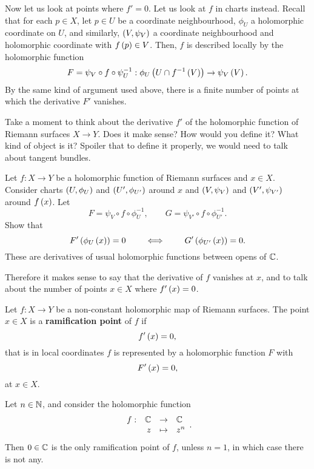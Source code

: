 Now let us look at points where $ f' = 0 $. Let us look at $ f $ in charts instead. Recall that for each $ p \in X $, let $ p \in U $ be a coordinate neighbourhood, $ \phi_U $ a holomorphic coordinate on $ U $, and similarly, $ \left( V, \psi_V \right) $ a coordinate neighbourhood and holomorphic coordinate with $ f\left( p \right) \in V $. Then, $ f $ is described locally by the holomorphic function
$$ F = \psi_V \circ f \circ \psi_U^{-1} : \phi_U\left( U \cap f^{-1}\left( V \right) \right) \to \psi_V\left( V \right). $$
By the same kind of argument used above, there is a finite number of points at which the derivative $ F' $ vanishes.

\begin{exercise}
Take a moment to think about the derivative $ f' $ of the holomorphic function of Riemann surfaces $ X \to Y $. Does it make sense? How would you define it? What kind of object is it? Spoiler that to define it properly, we would need to talk about tangent bundles.
\end{exercise}

\begin{exercise}
Let $ f : X \to Y $ be a holomorphic function of Riemann surfaces and $ x \in X $. Consider charts $ \left( U, \phi_U \right) $ and $ \left( U', \phi_{U'} \right) $ around $ x $ and $ \left( V, \psi_V \right) $ and $ \left( V', \psi_{V'} \right) $ around $ f\left( x \right) $. Let
$$ F = \psi_V \circ f \circ \phi_U^{-1}, \qquad G = \psi_{V'} \circ f \circ \phi_{U'}^{-1}. $$
Show that
$$ F'\left( \phi_U\left( x \right) \right) = 0 \qquad \iff \qquad G'\left( \phi_{U'}\left( x \right) \right) = 0. $$
These are derivatives of usual holomorphic functions between opens of $ \mathbb{C} $.
\end{exercise}

Therefore it makes sense to say that the derivative of $ f $ vanishes at $ x $, and to talk about the number of points $ x \in X $ where $ f'\left( x \right) = 0 $.

\pagebreak

\begin{definition}
Let $ f : X \to Y $ be a non-constant holomorphic map of Riemann surfaces. The point $ x \in X $ is a \textbf{ramification point} of $ f $ if
$$ f'\left( x \right) = 0, $$
that is in local coordinates $ f $ is represented by a holomorphic function $ F $ with
$$ F'\left( x \right) = 0, $$
at $ x \in X $.
\end{definition}

\begin{example}
\label{eg:17.9}
Let $ n \in \mathbb{N} $, and consider the holomorphic function
$$ \function[f]{\C}{\C}{z}{z^n}. $$
Then $ 0 \in \mathbb{C} $ is the only ramification point of $ f $, unless $ n = 1 $, in which case there is not any.
\end{example}

